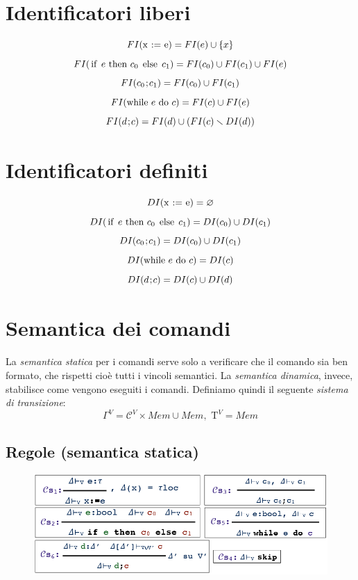 \documentclass[a4paper,oneside,titlepage]{book}
\begin{document}
\section{Identificatori liberi}
\[ FI(\text{\lstinline|x := e|}) = FI(e) \cup \{x\} \]
\[ FI(\text{\lstinline|if| }e\text{ \lstinline|then| }c_0\text{ \lstinline|else| }c_1) = FI(c_0) \cup FI(c_1) \cup FI(e) \]
\[ FI(c_0 \text{\lstinline|;|} c_1) = FI(c_0) \cup FI(c_1) \]
\[ FI(\text{\lstinline|while| }e\text{ \lstinline|do| }c) = FI(c) \cup FI(e) \]
\[ FI(d \text{\lstinline|;|} c) = FI(d) \cup (FI(c) \smallsetminus DI(d)) \]

\section{Identificatori definiti}
\[ DI(\text{\lstinline|x := e|}) = \varnothing \]
\[ DI(\text{\lstinline|if| }e\text{ \lstinline|then| }c_0\text{ \lstinline|else| }c_1) = DI(c_0) \cup DI(c_1) \]
\[ DI(c_0 \text{\lstinline|;|} c_1) = DI(c_0) \cup DI(c_1) \]
\[ DI(\text{\lstinline|while| }e\text{ \lstinline|do| }c) = DI(c) \]
\[ DI(d \text{\lstinline|;|} c) = DI(c) \cup DI(d) \]

\section{Semantica dei comandi}
La \textit{semantica statica} per i comandi serve solo a verificare che il comando sia ben formato, che rispetti cioè tutti i vincoli semantici. La \textit{semantica dinamica}, invece, stabilisce come vengono eseguiti i comandi. Definiamo quindi il seguente \textit{sistema di transizione}:
\[ \Gamma^V = \mathcal{C}^V \times Mem \cup Mem, \text{ T}^V = Mem \]

\subsection{Regole (semantica statica)}
\label{sec:comSemStat}
\begin{figure}[htp]
	\centering
	\includegraphics[width=\textwidth, height=\textheight, keepaspectratio]{comRegole1.png}
\end{figure}
\end{document}
